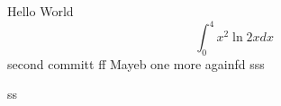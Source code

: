 \documentclass{article}
\begin{document}
Hello World
$$\int_0^4 x^2 \ln{2x}dx$$
second committ  ff
Mayeb
one more
againfd
sss

ss
\end{document}
